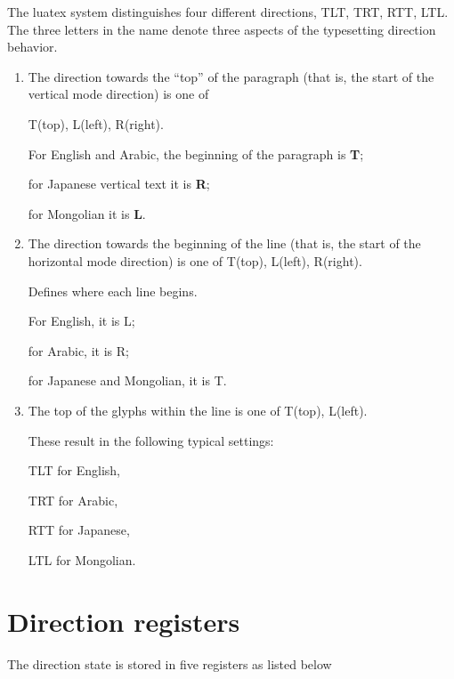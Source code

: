 The luatex system distinguishes four different directions,
TLT, TRT, RTT, LTL.
The three letters in the name denote three aspects of the typesetting direction behavior.

\begin{enumerate}
\item
The direction towards the \enquote{top} of the paragraph
(that is, the start of the vertical mode direction)
is one of 

T(top), L(left), R(right).

For English and Arabic, the beginning of the paragraph is \textbf{T};

for Japanese vertical text it is \textbf{R};

for Mongolian it is \textbf{L}.


\item 
The direction towards the beginning of the line
(that is, the start of the horizontal mode direction)
is one of
T(top), L(left), R(right).

Defines  where  each  line  begins.

For  English, it is L;

for Arabic, it is R;

for Japanese and Mongolian, it is T.


\item 
The top of the glyphs within the line
is one of
T(top), L(left).

\bigskip

These result in the following typical settings:

TLT for English,

TRT for  Arabic,

RTT for  Japanese,

LTL for  Mongolian.

\end{enumerate}



\section{Direction registers}

The direction state is stored in five registers as listed below




